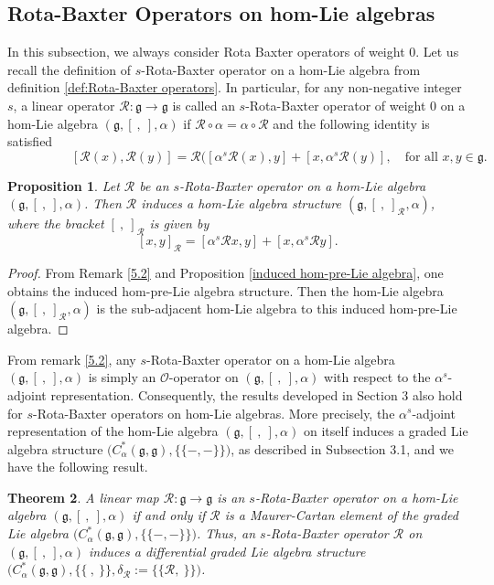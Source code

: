 \documentclass[a4paper,11pt]{amsart}
\theoremstyle{plain}
\newtheorem{theorem}{Theorem}[section]
\newtheorem{proposition}[theorem]{Proposition}
\theoremstyle{definition}
\theoremstyle{remark}
\numberwithin{equation}{section}
\begin{document}
\subsection{Rota-Baxter Operators on hom-Lie algebras}
In this subsection, we always consider Rota Baxter operators of weight $0$. Let us recall the definition of $s$-Rota-Baxter operator on a hom-Lie algebra from definition \ref{def:Rota-Baxter operators}. In particular, for any non-negative integer $s$, a linear operator $\mathcal{R}: \mathfrak{g} \rightarrow \mathfrak{g}$ is called an $s$-Rota-Baxter operator of weight $0$ on a hom-Lie algebra $(\mathfrak{g},[~,~],\alpha)$ if $\mathcal{R}\circ \alpha= \alpha\circ \mathcal{R}$ and the following identity is satisfied
\begin{equation*} 
\quad\quad\quad\quad\quad[\mathcal{R}(x), \mathcal{R}(y)]= \mathcal{R}([\alpha^s \mathcal{R}(x), y]+ [x, \alpha^s \mathcal{R}(y)],\quad\mbox{for all }x,y\in \mathfrak{g}.
\end{equation*}

\begin{proposition}\label{induced hom-Lie algebra}
Let $\mathcal{R}$ be an $s$-Rota-Baxter operator on a hom-Lie algebra $(\mathfrak{g}, [~,~], \alpha)$. Then $\mathcal{R}$ induces a hom-Lie algebra structure $(\mathfrak{g},[~,~]_\mathcal{R},\alpha)$, where the bracket $[~,~]_\mathcal{R}$ is given by 
$$[x, y]_\mathcal{R}= [\alpha^s \mathcal{R}x, y] + [x, \alpha^s \mathcal{R}y].$$ 
\end{proposition}
\begin{proof}
From Remark \ref{5.2} and Proposition \ref{induced hom-pre-Lie algebra}, one obtains the induced hom-pre-Lie algebra structure. Then the hom-Lie algebra $(\mathfrak{g},[~,~]_\mathcal{R},\alpha)$ is the sub-adjacent hom-Lie algebra to this induced hom-pre-Lie algebra.
\end{proof}

From remark \ref{5.2}, any $s$-Rota-Baxter operator on a hom-Lie algebra $(\mathfrak{g},[~,~],\alpha)$ is simply an $\mathcal{O}$-operator on $(\mathfrak{g}, [~,~], \alpha)$ with respect to the $\alpha^s$-adjoint representation. Consequently, the results developed in Section $3$ also hold for $s$-Rota-Baxter operators on hom-Lie algebras. More precisely, the $\alpha^s$-adjoint representation of the hom-Lie algebra $(\mathfrak{g},[~,~],\alpha)$ on itself induces a graded Lie algebra structure $\big(C^*_{\alpha}(\mathfrak{g},\mathfrak{g}),\{\!\!\{-,-\}\!\!\}\big)$, as described in Subsection 3.1, and we have the following result.
\begin{theorem}
A linear map $\mathcal{R}: \mathfrak{g} \rightarrow \mathfrak{g}$ is an $s$-Rota-Baxter operator on a hom-Lie algebra $(\mathfrak{g},[~,~],\alpha)$ if and only if $\mathcal{R}$ is a Maurer-Cartan element of the graded Lie algebra $\big(C^*_{\alpha}(\mathfrak{g},\mathfrak{g}),\{\!\!\{-,-\}\!\!\}\big)$. Thus, an $s$-Rota-Baxter operator $\mathcal{R}$ on $(\mathfrak{g},[~,~],\alpha)$ induces a differential graded Lie algebra structure $\big(C^*_{\alpha}(\mathfrak{g},\mathfrak{g}),\{\!\!\{~,~\}\!\!\},\delta_\mathcal{R}:=\{\!\!\{\mathcal{R},~\}\!\!\}\big)$.  
\end{theorem}
\end{document}

